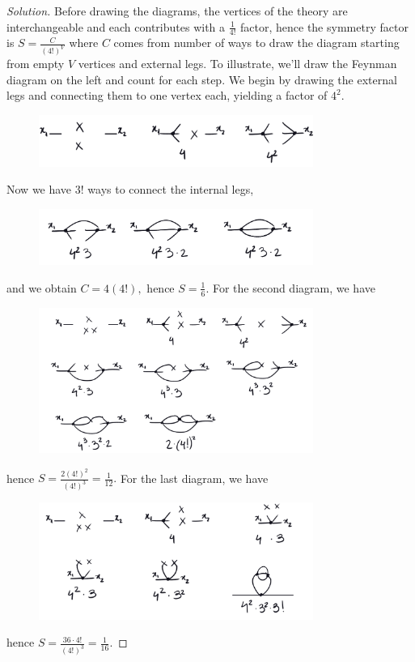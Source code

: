 \begin{proof}[Solution]
   Before drawing the diagrams, the vertices of the theory are interchangeable and each contributes with a \(\frac{1}{4!}\) factor, hence the symmetry factor is \(S = \frac{C}{(4!)^V}\) where \(C\) comes from number of ways to draw the diagram starting from empty \(V\) vertices and external legs. To illustrate, we'll draw the Feynman diagram on the left and count for each step. We begin by drawing the external legs and connecting them to one vertex each, yielding a factor of \(4^2\).
   \begin{figure}[H]
      \centering
      \includegraphics[width=0.8\textwidth]{p2ai.png}
   \end{figure}
   \noindent Now we have \(3!\) ways to connect the internal legs,
   \begin{figure}[H]
      \centering
      \includegraphics[width=0.8\textwidth]{p2ai2.png}
   \end{figure}
   \noindent and we obtain \(C = 4 (4!),\)  hence \(S = \frac16.\) For the second diagram, we have 
   \begin{figure}[H]
      \centering
      \includegraphics[width=0.8\textwidth]{p2aii.png}
   \end{figure}
   \noindent hence \(S = \frac{2(4!)^2}{(4!)^3} = \frac1{12}.\) For the last diagram, we have
   \begin{figure}[H]
      \centering
      \includegraphics[width=0.8\textwidth]{p2aiii.png}
   \end{figure}
   \noindent hence \(S = \frac{36 \cdot 4!}{(4!)^3} = \frac{1}{16}.\)


\end{proof}
